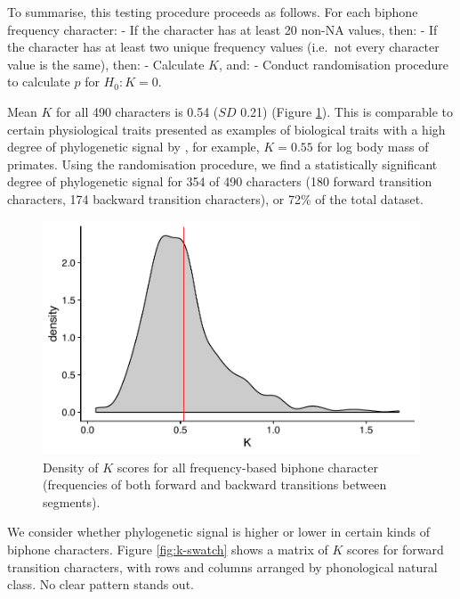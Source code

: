 To summarise, this testing procedure proceeds as follows. For each biphone frequency character:
- If the character has at least 20 non-NA values, then:
- If the character has at least two unique frequency values (i.e.~not every character value is the same), then:
- Calculate \(K\), and:
- Conduct randomisation procedure to calculate \(p\) for \(H_0: K = 0\).

Mean \(K\) for all 490 characters is 0.54 (\(SD\) 0.21) (Figure \ref{fig:k-density}). This is comparable to certain physiological traits presented as examples of biological traits with a high degree of phylogenetic signal by \textcite{blomberg_testing_2003}, for example, \(K=0.55\) for log body mass of primates. Using the \textcite{blomberg_testing_2003} randomisation procedure, we find a statistically significant degree of phylogenetic signal for 354 of 490 characters (180 forward transition characters, 174 backward transition characters), or 72\% of the total dataset.

\begin{figure}

{\centering \includegraphics[width=0.66\linewidth]{fig/k-density} 

}

\caption{Density of $K$ scores for all frequency-based biphone character (frequencies of both forward and backward transitions between segments).}\label{fig:k-density}
\end{figure}

We consider whether phylogenetic signal is higher or lower in certain kinds of biphone characters. Figure \ref{fig:k-swatch} shows a matrix of \(K\) scores for forward transition characters, with rows and columns arranged by phonological natural class. No clear pattern stands out.

